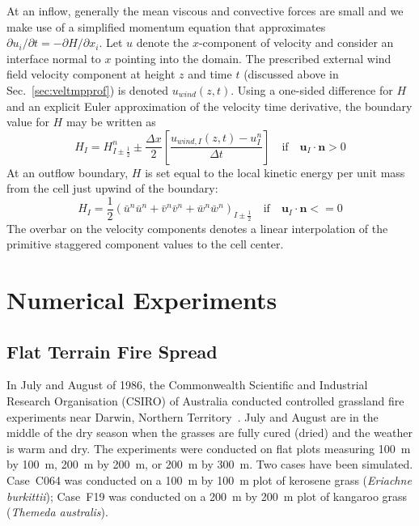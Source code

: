 \documentclass[journal,article,atmosphere,submit,moreauthors,pdftex]{Definitions/mdpi}
\begin{document}
At an inflow, generally the mean viscous and convective forces are small and we make use of a simplified momentum equation that approximates $\partial u_i/\partial t = -\partial H/\partial x_i$.  Let $u$ denote the $x$-component of velocity and consider an interface normal to $x$ pointing into the domain.  The prescribed external wind field velocity component at height $z$ and time $t$ (discussed above in Sec.~\ref{sec:veltmpprof}) is denoted $u_{wind}(z,t)$.  Using a one-sided difference for $H$ and an explicit Euler approximation of the velocity time derivative, the boundary value for $H$ may be written as 
\begin{equation}
\label{eq:Hin}
H_I = H_{I\pm\frac{1}{2}}^n \pm \frac{\Delta x}{2}\left[\frac{u_{wind,I}(z,t) - u_I^n}{\Delta t}\right] \quad \mbox{if} \quad \mathbf{u}_I\cdot\mathbf{n}>0
\end{equation}
At an outflow boundary, $H$ is set equal to the local kinetic energy per unit mass from the cell just upwind of the boundary:
\begin{equation}
\label{eq:Hout}
H_I = \frac{1}{2}(\bar{u}^n \bar{u}^n + \bar{v}^n \bar{v}^n + \bar{w}^n \bar{w}^n)_{I\pm\frac{1}{2}} \quad \mbox{if} \quad \mathbf{u}_I\cdot\mathbf{n}<=0
\end{equation}
The overbar on the velocity components denotes a linear interpolation of the primitive staggered component values to the cell center.

\section{Numerical Experiments} \label{sec:numexp}


\subsection{Flat Terrain Fire Spread}  \label{sec:simexp}

In July and August of 1986, the Commonwealth Scientific and Industrial Research Organisation (CSIRO) of Australia conducted controlled grassland fire experiments near Darwin, Northern Territory~\cite{Cheney:IJWF1993}. July and August are in the middle of the dry season when the grasses are fully cured (dried) and the weather is warm and dry. The experiments were conducted on flat plots measuring 100~m by 100~m, 200~m by 200~m, or 200~m by 300~m. Two cases have been simulated. Case~C064 was conducted on a 100~m by 100~m plot of kerosene grass ({\it Eriachne burkittii}); Case~F19 was conducted on a 200~m by 200~m plot of kangaroo grass ({\it Themeda australis}).
\end{document}
